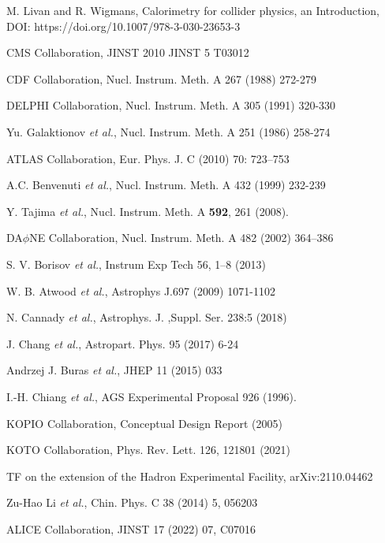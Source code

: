 \documentclass[12pt,times,draftclsnofoot,a4paper]{elsarticle}
\begin{document}
\begin{thebibliography}{99}
 
M. Livan and R. Wigmans, Calorimetry for collider physics, an Introduction, DOI: https://doi.org/10.1007/978-3-030-23653-3
 
CMS Collaboration, JINST 2010 JINST 5 T03012

CDF Collaboration, Nucl. Instrum. Meth. A 267 (1988) 272-279
 
DELPHI Collaboration, Nucl. Instrum. Meth. A 305 (1991) 320-330

Yu. Galaktionov {\it et al.}, Nucl. Instrum. Meth. A 251 (1986) 258-274

ATLAS Collaboration, Eur. Phys. J. C (2010) 70: 723–753

A.C. Benvenuti {\it et al.}, Nucl. Instrum. Meth. A 432 (1999) 232-239

Y. Tajima {\it et al.}, Nucl. Instrum. Meth. A {\bf 592}, 261 (2008).

DA$\phi$NE Collaboration, Nucl. Instrum. Meth. A 482 (2002) 364–386

S. V. Borisov {\it et al.}, Instrum Exp Tech 56, 1–8 (2013)

W. B. Atwood {\it et al.}, Astrophys J.697 (2009) 1071-1102

N. Cannady {\it et al.}, Astrophys. J. ,Suppl. Ser. 238:5 (2018) 

J. Chang {\it et al.}, Astropart. Phys. 95 (2017) 6-24

Andrzej J. Buras {\it et al.}, JHEP 11 (2015) 033

I.-H. Chiang {\it et al.}, AGS Experimental Proposal 926 (1996).

KOPIO Collaboration, Conceptual Design Report (2005)

KOTO Collaboration, Phys. Rev. Lett. 126, 121801 (2021)
 
TF on the extension of the Hadron Experimental Facility, arXiv:2110.04462


Zu-Hao Li {\it et al.}, Chin. Phys. C 38 (2014) 5, 056203

ALICE Collaboration, JINST 17 (2022) 07, C07016


\end{thebibliography}
\end{document}
